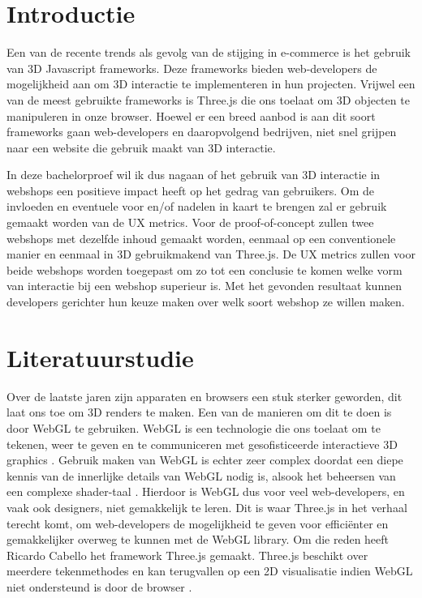 
\section{Introductie}%
\label{sec:introductie}

Een van de recente trends als gevolg van de stijging in e-commerce is het gebruik van 3D Javascript frameworks. Deze frameworks bieden web-developers de mogelijkheid aan om 3D interactie te implementeren in hun projecten. Vrijwel een van de meest gebruikte frameworks is Three.js die ons toelaat om 3D objecten te manipuleren in onze browser. Hoewel er een breed aanbod is aan dit soort frameworks gaan web-developers en daaropvolgend bedrijven, niet snel grijpen naar een website die gebruik maakt van 3D interactie.

In deze bachelorproef wil ik dus nagaan of het gebruik van 3D interactie in webshops een positieve impact heeft op het gedrag van gebruikers. Om de invloeden en eventuele voor en/of nadelen in kaart te brengen zal er gebruik gemaakt worden van de UX metrics. Voor de proof-of-concept zullen twee webshops met dezelfde inhoud gemaakt worden, eenmaal op een conventionele manier en eenmaal in 3D gebruikmakend van Three.js. De UX metrics zullen voor beide webshops worden toegepast om zo tot een conclusie te komen welke vorm van interactie bij een webshop superieur is. Met het gevonden resultaat kunnen developers gerichter hun keuze maken over welk soort webshop ze willen maken.


\section{Literatuurstudie}%
\label{sec:literatuurstudie}

Over de laatste jaren zijn apparaten en browsers een stuk sterker geworden, dit laat ons toe om 3D renders te maken. Een van de manieren om dit te doen is door WebGL te gebruiken. WebGL is een technologie die ons toelaat om te tekenen, weer te geven en te communiceren met gesofisticeerde interactieve 3D graphics \autocite{Matsuda2013}. Gebruik maken van WebGL is echter zeer complex doordat een diepe kennis van de innerlijke details van WebGL  nodig is, alsook het beheersen van een complexe shader-taal \autocite{Dirksen:2015aa}. Hierdoor is WebGL dus voor veel web-developers, en vaak ook designers, niet gemakkelijk te leren. Dit is waar Three.js in het verhaal terecht komt, om web-developers de mogelijkheid te geven voor efficiënter en gemakkelijker overweg te kunnen met de WebGL library. Om die reden heeft Ricardo Cabello het framework Three.js gemaakt. Three.js beschikt over meerdere tekenmethodes en kan terugvallen op een 2D visualisatie indien WebGL niet ondersteund is door de browser \autocite{Danchilla2012}.

